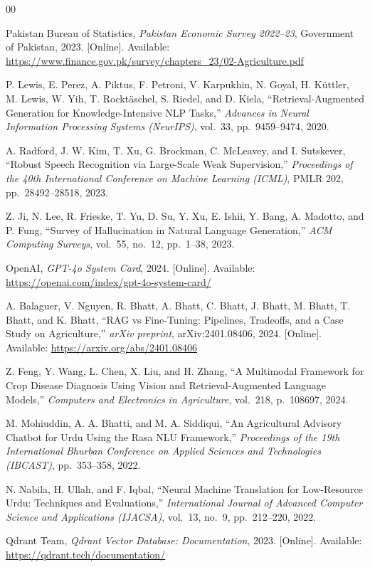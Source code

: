 \documentclass[conference]{IEEEtran}
\begin{document}
\begin{thebibliography}{00}

Pakistan Bureau of Statistics, \textit{Pakistan Economic Survey 2022--23}, Government of
Pakistan, 2023. [Online]. Available:
\url{https://www.finance.gov.pk/survey/chapters_23/02-Agriculture.pdf}

P. Lewis, E. Perez, A. Piktus, F. Petroni, V. Karpukhin, N. Goyal, H. K{\"u}ttler,
M. Lewis, W. Yih, T. Rockt{\"a}schel, S. Riedel, and D. Kiela,
``Retrieval-Augmented Generation for Knowledge-Intensive NLP Tasks,''
\textit{Advances in Neural Information Processing Systems (NeurIPS)}, vol.~33,
pp.~9459--9474, 2020.

A. Radford, J. W. Kim, T. Xu, G. Brockman, C. McLeavey, and I. Sutskever,
``Robust Speech Recognition via Large-Scale Weak Supervision,''
\textit{Proceedings of the 40th International Conference on Machine Learning (ICML)},
PMLR 202, pp.~28492--28518, 2023.

Z. Ji, N. Lee, R. Frieske, T. Yu, D. Su, Y. Xu, E. Ishii, Y. Bang, A. Madotto,
and P. Fung,
``Survey of Hallucination in Natural Language Generation,''
\textit{ACM Computing Surveys}, vol.~55, no.~12, pp.~1--38, 2023.

OpenAI, \textit{GPT-4o System Card}, 2024. [Online]. Available:
\url{https://openai.com/index/gpt-4o-system-card/}

A. Balaguer, V. Nguyen, R. Bhatt, A. Bhatt, C. Bhatt, J. Bhatt, M. Bhatt,
T. Bhatt, and K. Bhatt,
``RAG vs Fine-Tuning: Pipelines, Tradeoffs, and a Case Study on Agriculture,''
\textit{arXiv preprint}, arXiv:2401.08406, 2024. [Online]. Available:
\url{https://arxiv.org/abs/2401.08406}

Z. Feng, Y. Wang, L. Chen, X. Liu, and H. Zhang,
``A Multimodal Framework for Crop Disease Diagnosis Using Vision and
Retrieval-Augmented Language Models,''
\textit{Computers and Electronics in Agriculture}, vol.~218, p.~108697, 2024.

M. Mohiuddin, A. A. Bhatti, and M. A. Siddiqui,
``An Agricultural Advisory Chatbot for Urdu Using the Rasa NLU Framework,''
\textit{Proceedings of the 19th International Bhurban Conference on Applied Sciences
and Technologies (IBCAST)}, pp.~353--358, 2022.

N. Nabila, H. Ullah, and F. Iqbal,
``Neural Machine Translation for Low-Resource Urdu: Techniques and Evaluations,''
\textit{International Journal of Advanced Computer Science and Applications (IJACSA)},
vol.~13, no.~9, pp.~212--220, 2022.

Qdrant Team, \textit{Qdrant Vector Database: Documentation}, 2023.
[Online]. Available: \url{https://qdrant.tech/documentation/}

\end{thebibliography}

\balance
\end{document}
